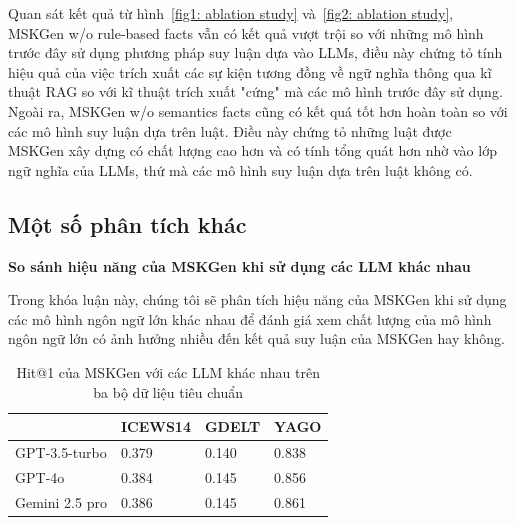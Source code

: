 Quan sát kết quả từ hình~\ref{fig1: ablation study} và~\ref{fig2: ablation study}, MSKGen w/o rule-based facts vẫn có kết quả
vượt trội so với những mô hình trước đây sử dụng phương pháp suy luận dựa vào LLMs, điều này chứng tỏ tính hiệu quả của việc 
trích xuất các sự kiện tương đồng về ngữ nghĩa thông qua kĩ thuật RAG so với kĩ thuật trích xuất "cứng" mà các mô hình trước 
đây sử dụng. Ngoài ra, MSKGen w/o semantics facts cũng có kết quá tốt hơn hoàn toàn so với các mô hình suy luận dựa trên luật.
Điều này chứng tỏ những luật được MSKGen xây dựng có chất lượng cao hơn và có tính tổng quát hơn nhờ vào lớp ngữ nghĩa của LLMs, thứ mà 
các mô hình suy luận dựa trên luật không có.

\subsection{Một số phân tích khác}
\vspace{1em}
\textbf{So sánh hiệu năng của MSKGen khi sử dụng các LLM khác nhau}

Trong khóa luận này, chúng tôi sẽ phân tích hiệu năng của MSKGen khi sử dụng các mô hình ngôn ngữ lớn khác nhau để 
đánh giá xem chất lượng của mô hình ngôn ngữ lớn có ảnh hưởng nhiều đến kết quả suy luận của MSKGen hay không.

\begin{table}[H]
\caption{Hit@1 của MSKGen với các LLM khác nhau trên ba bộ dữ liệu tiêu chuẩn}
\label{tab:table57}
\begin{adjustbox}{width=\textwidth}
\begin{tabular}{|l|l|l|l|}
\hline
               & ICEWS14 & GDELT & YAGO  \\ \hline
GPT-3.5-turbo  & 0.379   & 0.140 & 0.838 \\ \hline
GPT-4o         & 0.384   & 0.145 & 0.856 \\ \hline
Gemini 2.5 pro & 0.386   & 0.145 & 0.861 \\ \hline
\end{tabular}
\end{adjustbox}  
\end{table}
\vspace{-5mm}

